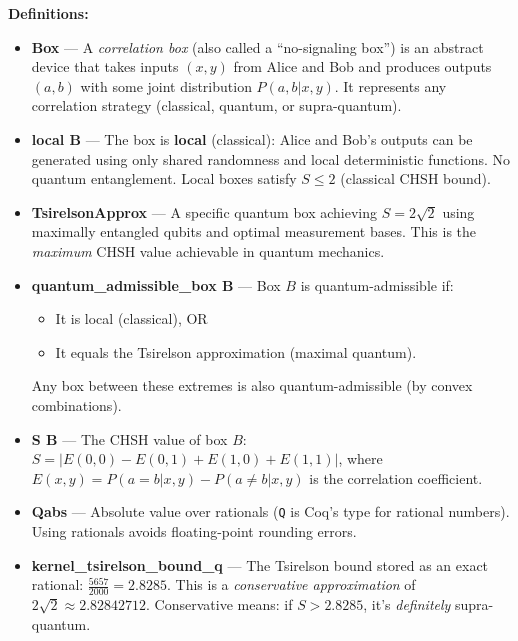 \textbf{Definitions:}
\begin{itemize}
    \item \textbf{Box} — A \textit{correlation box} (also called a ``no-signaling box'') is an abstract device that takes inputs $(x, y)$ from Alice and Bob and produces outputs $(a, b)$ with some joint distribution $P(a,b|x,y)$. It represents any correlation strategy (classical, quantum, or supra-quantum).
    
    \item \textbf{local B} — The box is \textbf{local} (classical): Alice and Bob's outputs can be generated using only shared randomness and local deterministic functions. No quantum entanglement. Local boxes satisfy $S \leq 2$ (classical CHSH bound).
    
    \item \textbf{TsirelsonApprox} — A specific quantum box achieving $S = 2\sqrt{2}$ using maximally entangled qubits and optimal measurement bases. This is the \textit{maximum} CHSH value achievable in quantum mechanics.
    
    \item \textbf{quantum\_admissible\_box B} — Box $B$ is quantum-admissible if:
    \begin{itemize}
        \item It is local (classical), OR
        \item It equals the Tsirelson approximation (maximal quantum).
    \end{itemize}
    Any box between these extremes is also quantum-admissible (by convex combinations).
    
    \item \textbf{S B} — The CHSH value of box $B$: $S = |E(0,0) - E(0,1) + E(1,0) + E(1,1)|$, where $E(x,y) = P(a=b|x,y) - P(a \neq b|x,y)$ is the correlation coefficient.
    
    \item \textbf{Qabs} — Absolute value over rationals (\texttt{Q} is Coq's type for rational numbers). Using rationals avoids floating-point rounding errors.
    
    \item \textbf{kernel\_tsirelson\_bound\_q} — The Tsirelson bound stored as an exact rational: $\frac{5657}{2000} = 2.8285$. This is a \textit{conservative approximation} of $2\sqrt{2} \approx 2.82842712$. Conservative means: if $S > 2.8285$, it's \textit{definitely} supra-quantum.
\end{itemize}


